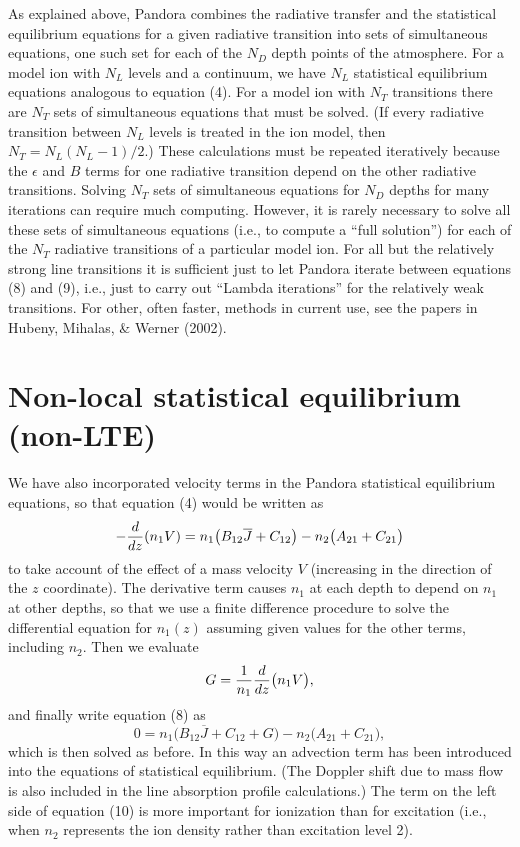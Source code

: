 \documentclass[11pt,twoside]{article}
\begin{document}
As explained above, Pandora combines the radiative transfer and
the statistical equilibrium equations for a given radiative
transition into sets of simultaneous equations, one such set for
each of the $N_D$ depth points of the atmosphere.  For a model ion
with $N_L$ levels and a continuum, we have $N_L$ statistical
equilibrium equations analogous to equation (4). For
a model ion with $N_T$ transitions there are $N_T$ sets of
simultaneous equations that must be solved.
(If every radiative transition between $N_L$ levels is treated
in the ion model, then $N_T = N_L ( N_L -1)/2$.) These calculations
must be repeated iteratively because the $\epsilon$ and $B$ terms
for one radiative transition depend on the other radiative
transitions. Solving $N_T$ sets of
simultaneous equations for $N_D$ depths 
for many iterations can require much computing.
However, it is rarely necessary to solve all these sets of
simultaneous equations (i.e., to compute a ``full solution'') for
each of the $N_T$ radiative transitions of a particular model ion.
For all but the relatively strong line transitions it is sufficient
just to let Pandora iterate between equations (8) and (9), i.e.,
just to carry out ``Lambda iterations'' for the relatively weak
transitions. For other, often faster, methods in current use,
see the papers in Hubeny, Mihalas, \& Werner (2002).


\section{Non-local statistical equilibrium (non-LTE)}

We have also incorporated velocity terms in the Pandora
statistical equilibrium equations, so that equation (4)
would be written as
\begin{equation}
 -{d \over d z} (n_1 V) = n_1 \bigl( B_{12}{\overline J}
+ C_{12}\bigr) - n_2 \bigl( A_{21} + C_{21} \bigr) 
\end{equation}
%
to take account of the effect of a mass velocity $V$
(increasing in the direction of the $z$ coordinate). The
derivative term causes $n_1$ at each depth to depend on $n_1$ at
other depths, so that we use a finite difference procedure to
solve the differential equation for $n_1(z)$ assuming given
values for the other terms, including $n_2$.  Then we evaluate
\begin{equation}
 G = { 1 \over n_1} {d \over d z} \bigl( n_1 V \bigr), 
\end{equation}
%
and finally write equation (8) as
\begin{equation}
 0 = n_1 \bigl( B_{12} {\overline J} + C_{12} + G \bigr) 
- n_2 \bigl( A_{21} + C_{21} \bigr), 
\end{equation}
%
which is then solved as before.
In this way an advection term has been
introduced into the equations of statistical equilibrium. 
(The Doppler shift due to mass flow is also included in the
line absorption profile calculations.) The term on the left side
of equation (10) is more important for ionization than for
excitation (i.e., when $n_2$ represents the ion density rather
than excitation level 2).
\end{document}
